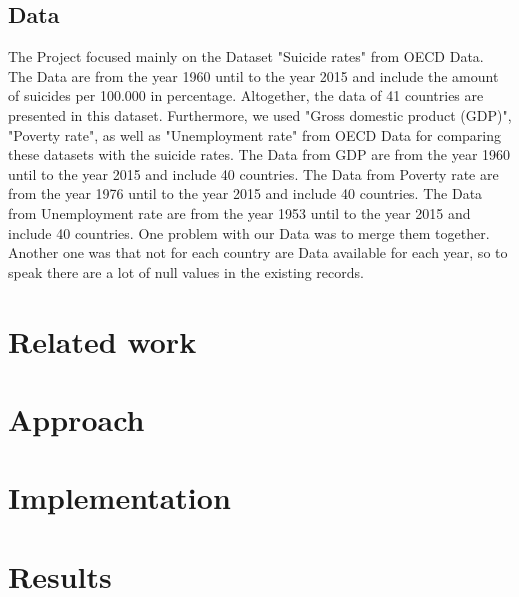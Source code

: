 \documentclass{vgtc}                          %
\begin{document}
\subsection{Data}

The Project focused mainly on the Dataset "Suicide rates" from OECD Data. The Data are from the year 1960 until to the year 2015 and include the amount of suicides per 100.000 in percentage. Altogether, the data of 41 countries are presented in this dataset. Furthermore, we used "Gross domestic product (GDP)", "Poverty rate", as well as "Unemployment rate" from OECD Data for comparing these datasets with the suicide rates.  The Data from GDP are from the year 1960 until to the year 2015 and include 40 countries. The Data from Poverty rate are from the year 1976 until to the year 2015 and include 40 countries. The Data from Unemployment rate are from the year 1953 until to the year 2015 and include 40 countries. One problem with our Data was to merge them together. Another one was that not for each country are Data available for each year, so to speak there are a lot of null values in the existing records.


\section{Related work}

\section{Approach}

\section{Implementation}

\section{Results}
\end{document}
